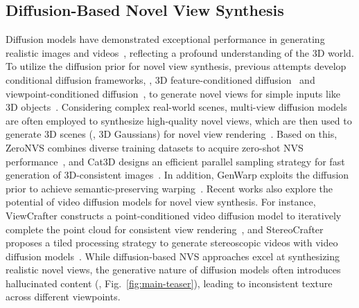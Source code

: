 \subsection{Diffusion-Based Novel View Synthesis} 
Diffusion models have demonstrated exceptional performance in generating realistic images and videos~\cite{rombach2022stablediffusion,xing2025dynamicrafter}, reflecting a profound understanding of the 3D world.
To utilize the diffusion prior for novel view synthesis, previous attempts develop conditional diffusion frameworks, \eg, 3D feature-conditioned diffusion~\cite{chan2023gennvs} and viewpoint-conditioned diffusion~\cite{liu2023zero123}, to generate novel views for simple inputs like 3D objects~\cite{zheng2024free3d}. Considering complex real-world scenes, multi-view diffusion models are often employed to synthesize high-quality novel views, which are then used to generate 3D scenes (\eg, 3D Gaussians) for novel view rendering~\cite{liu2024reconx,wu2024reconfusion}. Based on this, ZeroNVS combines diverse training datasets to acquire zero-shot NVS performance~\cite{sargent2024zeronvs}, and Cat3D designs an efficient parallel sampling strategy for fast generation of 3D-consistent images~\cite{gao2024cat3d}. In addition, GenWarp exploits the diffusion prior to achieve semantic-preserving warping~\cite{seo2024genwarp}. Recent works also explore the potential of video diffusion models for novel view synthesis. For instance, ViewCrafter constructs a point-conditioned video diffusion model to iteratively complete the point cloud for consistent view rendering~\cite{yu2024viewcrafter}, and StereoCrafter proposes a tiled processing strategy to generate stereoscopic videos with video diffusion models~\cite{zhao2024stereocrafter}. While diffusion-based NVS approaches excel at synthesizing realistic novel views, the generative nature of diffusion models often introduces hallucinated content (\eg, Fig.~\ref{fig:main-teaser}), leading to inconsistent texture across different viewpoints.


